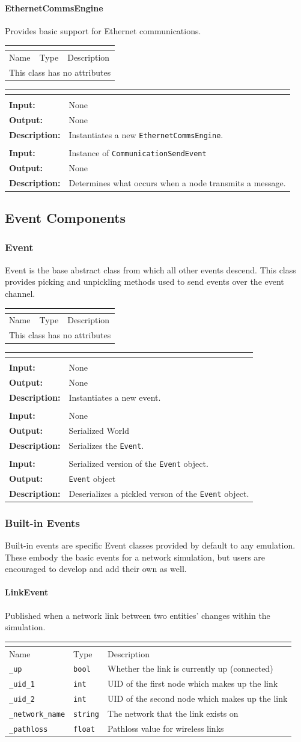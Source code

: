 \documentclass[titlepage]{article}
\newcommand{\operations}[1]{
\begin{center}
    \begin{longtable}{|p{4cm}|p{10cm + 2.0\tabcolsep}|}
    \hline
    \multicolumn{2}{|l|}{\cellcolor[gray]{0.5}{\textbf{Operations}}} \\ \hline
#1
    \end{longtable}
\end{center}
}
\newcommand{\operation}[4]{
    \hline
    \multicolumn{2}{|l|}{\cellcolor[gray]{0.8}{\texttt{#1}}} \\ \hline
    \hspace{7pt}\textbf{Input:} & #2 \\ \hline
    \hspace{7pt}\textbf{Output:} & #3 \\ \hline
    \hspace{7pt}\textbf{Description:} & #4 \\ \hline
}
\newcommand{\noattributes}{
    \begin{center}
        \begin{tabular}{|p{3cm}|p{3cm}|p{8cm}|}
            \multicolumn{3}{|l|}{\cellcolor[gray]{0.5}{\textbf{Attributes}}} \\ \hline
            \rowcolor[gray]{0.8} Name & Type & Description \\ \hline 
            \multicolumn{3}{|c|}{This class has no attributes} \\ \hline
        \end{tabular}
    \end{center}
}
\newcommand{\attributes}[1]{
    \begin{center}
        \begin{tabular}{|p{3cm}|p{3cm}|p{8cm}|}
            \multicolumn{3}{|l|}{\cellcolor[gray]{0.5}{\textbf{Attributes}}} \\ \hline
            \rowcolor[gray]{0.8} Name & Type & Description \\ \hline 
            #1
        \end{tabular}
    \end{center}
}
\newcommand{\attribute}[3]{
    \texttt{#1} & \texttt{#2} & #3 \\ \hline
}
\begin{document}
\paragraph{EthernetCommsEngine}{Provides basic support for Ethernet communications.}

\noattributes

\operations
{
    \operation{\_\_init\_\_()}{None}{None}{Instantiates a new \texttt{EthernetCommsEngine}.}
    \operation{\_on\_send(event)}{Instance of \texttt{CommunicationSendEvent}}{None}{Determines what occurs when a node transmits a message.}
}

\subsection{Event Components}
\subsubsection{Event}{Event is the base abstract class from which all other events descend.  This class provides picking and unpickling methods used to send events over the event channel.}

\noattributes

\operations
{
    \operation{\_\_init\_\_()}{None}{None}{Instantiates a new event.}
    \operation{pickle()}{None}{Serialized World}{Serializes the \texttt{Event}.}
    \operation{from\_pickle(pickled)}{Serialized version of the \texttt{Event} object.}{\texttt{Event} object}{Deserializes a pickled verson of the \texttt{Event} object.}
}

\subsubsection{Built-in Events}
Built-in events are specific Event classes provided by default to any emulation. These embody the basic events for a network simulation, but users are encouraged to develop and add their own as well.
\paragraph{LinkEvent}{Published when a network link between two entities' changes within the simulation.}

\attributes{
    \attribute{\_up}{bool}{Whether the link is currently up (connected)}
    \attribute{\_uid\_1}{int}{UID of the first node which makes up the link}
    \attribute{\_uid\_2}{int}{UID of the second node which makes up the link}
    \attribute{\_network\_name}{string}{The network that the link exists on}
    \attribute{\_pathloss}{float}{Pathloss value for wireless links}
}
\end{document}

